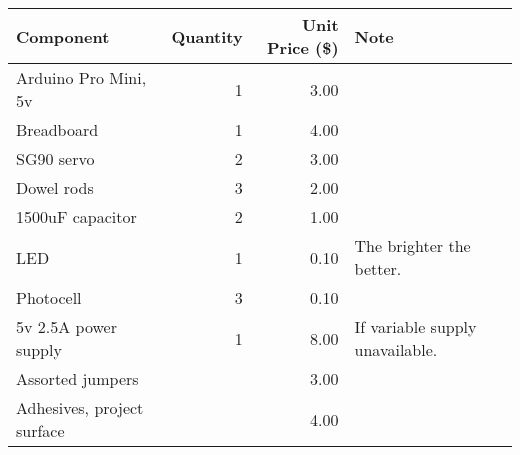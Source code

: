\documentclass{article}
\begin{document}
	\begin{center}
		\begin{tabular}{ l r r  p{5cm} }
			\hline
			Component & Quantity & Unit Price (\$) & Note \\ \hline
			Arduino Pro Mini, 5v & 1 & 3.00 &  \\ 
			Breadboard & 1 & 4.00 & \\
			SG90 servo & 2 & 3.00 & \\ 
			Dowel rods & 3 & 2.00 & \\
			1500uF capacitor & 2 & 1.00 & \\ 
			LED & 1 & 0.10 & The brighter the better.\\ 
			Photocell & 3 & 0.10 & \\ 
			5v 2.5A power supply & 1 & 8.00 & If variable supply unavailable. \\ 
			Assorted jumpers & & 3.00 & \\
			Adhesives, project surface & & 4.00 & \\
			\hline
		\end{tabular}
	\end{center}
	
	
\end{document}
